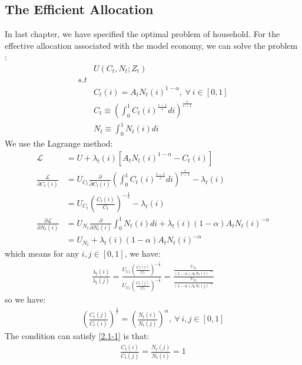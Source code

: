 \documentclass{article}
\numberwithin{equation}{section}
\begin{document}
\subsection{The Efficient Allocation}
In last chapter, we have specified the optimal problem of household. For the effective allocation associated with the model economy, we can solve the problem :
	\begin{align*}
		&U(C_t, N_t; Z_t)\\
		s.t&\\
		&C_t(i) = A_t N_t(i)^{1-\alpha},\ \forall\ i \in [0, 1]\\
		&C_t \equiv \left( \int^1_0 C_t(i)^{\frac{\epsilon-1}{\epsilon}} di \right)^{\frac{\epsilon}{\epsilon-1}}\\
		&N_t \equiv \int^1_0 N_t(i) di
	\end{align*}
We use the Lagrange method:
	\begin{align*}
		\mathscr{L} &= U + \lambda_t(i)[A_t N_t(i)^{1-\alpha} - C_t(i)]\\
		\frac{\mathscr{L}}{\partial C_t(i)} &= U_{C_t} \frac{\partial}{\partial C_t(i)} \left( \int^1_0 C_t(i)^{\frac{\epsilon-1}{\epsilon}} di \right)^{\frac{\epsilon}{\epsilon-1}} - \lambda_t(i)\\
		&= U_{C_t} \left( \frac{C_t(i)}{C_t} \right)^{-\frac{1}{\epsilon}} - \lambda_t(i)\\
		\frac{\partial \mathscr{L}}{\partial N_t(i)} &= U_{N_t} \frac{\partial}{\partial N_t(i)} \int^1_0 N_t(i) di + \lambda_t(i) (1 - \alpha) A_t N_t(i)^{-\alpha}\\
		&= U_{N_t} + \lambda_t(i) (1 - \alpha) A_t N_t(i)^{-\alpha}
	\end{align*}
which means for any $i,j \in [0, 1]$, we have:
	\begin{align*}
		\frac{\lambda_t(i)}{\lambda_t(j)} = \frac{U_{C_t} \left( \frac{C_t(i)}{C_t} \right)^{-\frac{1}{\epsilon}}}{U_{C_t} \left( \frac{C_t(j)}{C_t} \right)^{-\frac{1}{\epsilon}}} = \frac{\frac{U_{N_t}}{(1 - \alpha)A_t N_t(i)^{-\alpha}}}{\frac{U_{N_t}}{(1 - \alpha)A_t N_t(j)^{-\alpha}}}
	\end{align*}
so we have:
	\begin{align}
		\left( \frac{C_t(j)}{C_t(i)} \right)^{\frac{1}{\epsilon}} = \left( \frac{N_t(i)}{N_t(j)} \right)^\alpha,\ \forall\ i,j \in [0, 1] \label{2.1-1}
	\end{align}
The condition can satisfy \eqref{2.1-1} is that:
	\begin{align*}
		\frac{C_t(i)}{C_t(j)} = \frac{N_t(j)}{N_t(i)} = 1
	\end{align*}
\end{document}
